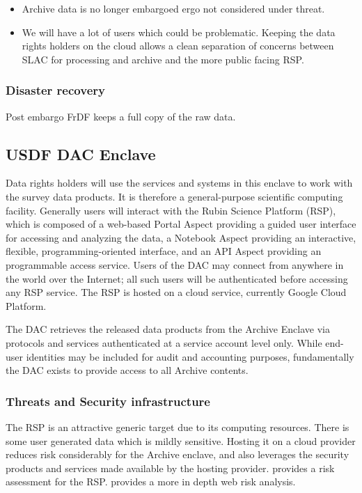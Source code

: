 \begin{itemize}
\item Archive data is no longer embargoed ergo not considered under threat.
\item We will have a lot of users which could be problematic. Keeping the data rights holders on the cloud allows a clean separation of concerns between SLAC for processing and archive and the more public facing \gls{RSP}.
\end{itemize}
\subsubsection{Disaster recovery}
Post embargo FrDF keeps a full copy of the raw data.



\subsection{ USDF \gls{DAC} Enclave}
Data rights holders will use the services and systems in this enclave to work with the survey data products.
It is therefore a general-purpose scientific computing facility. Generally users will interact with the Rubin Science Platform (\gls{RSP}), which is composed of a web-based Portal Aspect providing a guided user interface for accessing and analyzing the data, a Notebook Aspect providing an interactive, flexible, programming-oriented interface, and an API Aspect providing an programmable access service.
Users of the DAC may connect from anywhere in the world over the Internet; all such users will be authenticated before accessing any \gls{RSP} service.
The \gls{RSP} is hosted on a cloud service, currently  Google Cloud Platform.

The DAC retrieves the released data products from the \gls{Archive} Enclave via protocols and services authenticated at a service account level only. While end-user identities may be included for audit and accounting purposes, fundamentally the DAC exists to provide access to all \gls{Archive} contents.

\subsubsection{ Threats and Security infrastructure}
The \gls{RSP} is  an attractive generic target due to its computing resources.
There is some user generated data which is mildly sensitive.
Hosting it on a cloud provider reduces risk considerably for the Archive enclave, and also leverages the security products and services made available by the hosting provider.
 provides a risk assessment for the \gls{RSP}.
 provides a more in depth web risk analysis.

